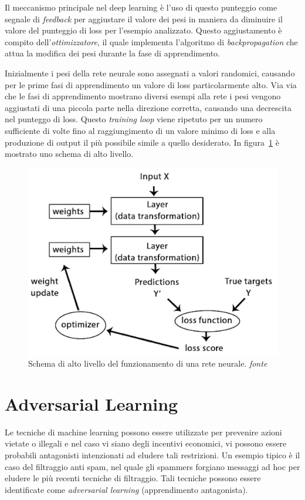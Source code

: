 Il meccanismo principale nel deep learning è l'uso di questo punteggio come segnale di \textit{feedback} per aggiustare il valore dei pesi in maniera da diminuire il valore del punteggio di loss per l'esempio analizzato. Questo aggiustamento è compito dell'\textit{ottimizzatore}, il quale implementa l'algoritmo di \textit{backpropagation} che attua la modifica dei pesi durante la fase di apprendimento.

Inizialmente i pesi della rete neurale sono assegnati a valori randomici, causando per le prime fasi di apprendimento un valore di loss particolarmente alto. Via via che le fasi di apprendimento mostrano diversi esempi alla rete i pesi vengono aggiustati di una piccola parte nella direzione corretta, causando una decrescita nel punteggo di loss. Questo \textit{training loop} viene ripetuto per un numero sufficiente di volte fino al raggiungimento di un valore minimo di loss e alla produzione di output il più possibile simile a quello desiderato. In figura~\ref{fig:neuralloss} è mostrato uno schema di alto livello.

\begin{figure}[!htbp]
	\centering
	\includegraphics[width=0.8\columnwidth]{figures/deeploss.png}
	\caption{Schema di alto livello del funzionamento di una rete neurale. \textit{fonte}%
	~\cite{chollet2017deep} \label{fig:neuralloss} }
\end{figure}

\newpage
\section{Adversarial Learning}
Le tecniche di machine learning possono essere utilizzate per prevenire azioni vietate o illegali e nel caso vi siano degli incentivi economici, vi possono essere probabili antagonisti intenzionati ad eludere tali restrizioni. Un esempio tipico è il caso del filtraggio anti spam, nel quale gli spammers forgiano messaggi ad hoc per eludere le più recenti tecniche di filtraggio. Tali tecniche possono essere identificate come \textit{adversarial learning} (apprendimento antagonista).

